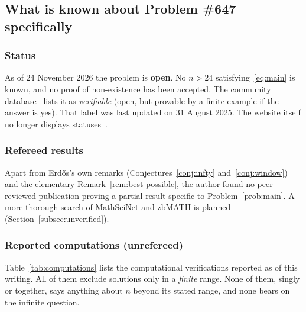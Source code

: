 \documentclass[11pt]{amsart}
\theoremstyle{plain}
\theoremstyle{definition}
\theoremstyle{remark}
\numberwithin{equation}{section}
\begin{document}
\subsection{What is known about Problem \#647 specifically}\label{subsec:specific}

\subsubsection*{Status}
As of 24 November 2026 the problem is \textbf{open}. No $n>24$ satisfying~\eqref{eq:main} is known, and no proof of non-existence has been accepted. The community database~\cite{TeorthDatabase} lists it as \emph{verifiable} (open, but provable by a finite example if the answer is yes). That label was last updated on 31 August 2025. The website itself no longer displays statuses~\cite{BloomChanges2026}.

\subsubsection*{Refereed results}
Apart from Erd\H{o}s's own remarks (Conjectures~\ref{conj:infty} and~\ref{conj:window}) and the elementary Remark~\ref{rem:best-possible}, the author found no peer-reviewed publication proving a partial result specific to Problem~\ref{prob:main}. A more thorough search of MathSciNet and zbMATH is planned (Section~\ref{subsec:unverified}).

\subsubsection*{Reported computations (unrefereed)}
Table~\ref{tab:computations} lists the computational verifications reported as of this writing. All of them exclude solutions only in a \emph{finite} range. None of them, singly or together, says anything about $n$ beyond its stated range, and none bears on the infinite question.
\end{document}
